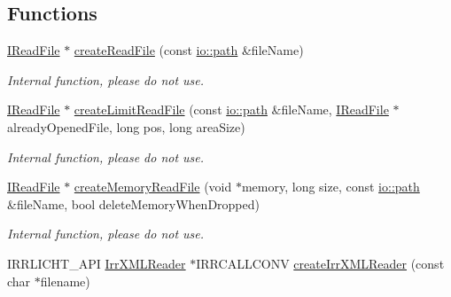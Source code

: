 \subsection*{Functions}
\begin{DoxyCompactItemize}
\item 
\mbox{\label{namespaceirr_1_1io_aa7ea26fafef4a9ce83ddc2da43442137}} 
\hyperlink{classirr_1_1io_1_1IReadFile}{I\+Read\+File} $\ast$ \hyperlink{namespaceirr_1_1io_aa7ea26fafef4a9ce83ddc2da43442137}{create\+Read\+File} (const \hyperlink{namespaceirr_1_1io_a6468281622ce3a1c46b72e19f32dded5}{io\+::path} \&file\+Name)
\begin{DoxyCompactList}\small\item\em Internal function, please do not use. \end{DoxyCompactList}\item 
\mbox{\label{namespaceirr_1_1io_ae068b48456c8496f1e738536d3edf013}} 
\hyperlink{classirr_1_1io_1_1IReadFile}{I\+Read\+File} $\ast$ \hyperlink{namespaceirr_1_1io_ae068b48456c8496f1e738536d3edf013}{create\+Limit\+Read\+File} (const \hyperlink{namespaceirr_1_1io_a6468281622ce3a1c46b72e19f32dded5}{io\+::path} \&file\+Name, \hyperlink{classirr_1_1io_1_1IReadFile}{I\+Read\+File} $\ast$already\+Opened\+File, long pos, long area\+Size)
\begin{DoxyCompactList}\small\item\em Internal function, please do not use. \end{DoxyCompactList}\item 
\mbox{\label{namespaceirr_1_1io_a3f239be357ea9bc622f4d36679e15a7f}} 
\hyperlink{classirr_1_1io_1_1IReadFile}{I\+Read\+File} $\ast$ \hyperlink{namespaceirr_1_1io_a3f239be357ea9bc622f4d36679e15a7f}{create\+Memory\+Read\+File} (void $\ast$memory, long size, const \hyperlink{namespaceirr_1_1io_a6468281622ce3a1c46b72e19f32dded5}{io\+::path} \&file\+Name, bool delete\+Memory\+When\+Dropped)
\begin{DoxyCompactList}\small\item\em Internal function, please do not use. \end{DoxyCompactList}\item 
I\+R\+R\+L\+I\+C\+H\+T\+\_\+\+A\+PI \hyperlink{namespaceirr_1_1io_a682f8a2c4c57259bfde1ec8fa27a565b}{Irr\+X\+M\+L\+Reader} $\ast$I\+R\+R\+C\+A\+L\+L\+C\+O\+NV \hyperlink{namespaceirr_1_1io_a638e38fd4c6d6e40ce4f332be6a3b570}{create\+Irr\+X\+M\+L\+Reader} (const char $\ast$filename)

\end{DoxyCompactItemize}
